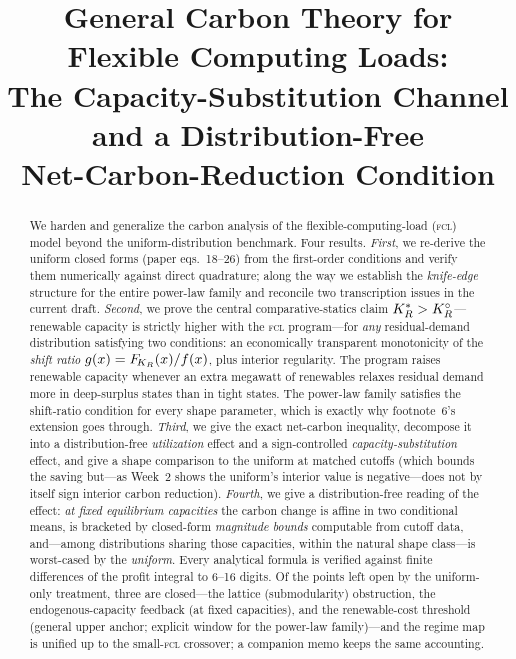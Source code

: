 \title[General Carbon Theory for Flexible Computing Loads]
{General Carbon Theory for Flexible Computing Loads:\\
The Capacity-Substitution Channel and a Distribution-Free\\
Net-Carbon-Reduction Condition}



\begin{abstract}
We harden and generalize the carbon analysis of the flexible-computing-load
(\textsc{fcl}) model beyond the uniform-distribution benchmark. Four results.
\emph{First}, we re-derive the uniform closed forms (paper eqs.\ 18--26) from
the first-order conditions and verify them numerically against direct
quadrature; along the way we establish the \emph{knife-edge} structure for the
entire power-law family and reconcile two transcription issues in the current
draft. \emph{Second}, we prove the central comparative-statics claim
$K_R^{*}>K_R^{\circ}$---renewable capacity is strictly higher with the \textsc{fcl}
program---for \emph{any} residual-demand distribution satisfying two conditions:
an economically transparent monotonicity of the \emph{shift ratio}
$g(x)=F_{\!K_R}(x)/f(x)$, plus interior regularity. The program raises renewable
capacity whenever an extra megawatt of renewables relaxes residual demand more in
deep-surplus states than in tight states. The power-law family satisfies the
shift-ratio condition for every shape parameter, which is exactly why footnote~6's
extension goes through. \emph{Third}, we give the exact net-carbon inequality,
decompose it into a distribution-free \emph{utilization} effect and a
sign-controlled \emph{capacity-substitution} effect, and give a shape comparison to the
uniform at matched cutoffs (which bounds the saving but---as Week~2 shows the uniform's
interior value is negative---does not by itself sign interior carbon reduction).
\emph{Fourth}, we give a
distribution-free reading of the effect: \emph{at fixed equilibrium capacities} the
carbon change is affine in two conditional means, is bracketed by closed-form
\emph{magnitude bounds} computable from cutoff data, and---among distributions
sharing those capacities, within the natural shape class---is worst-cased by the
\emph{uniform}. Every analytical formula is verified against finite
differences of the profit integral to 6--16 digits. Of the points left open by the
uniform-only treatment, three are closed---the lattice (submodularity)
obstruction, the endogenous-capacity feedback (at fixed capacities), and the
renewable-cost threshold (general upper anchor; explicit window for the power-law
family)---and the regime map is unified up to the small-\textsc{fcl} crossover; a
companion memo keeps the same accounting.
\end{abstract}



